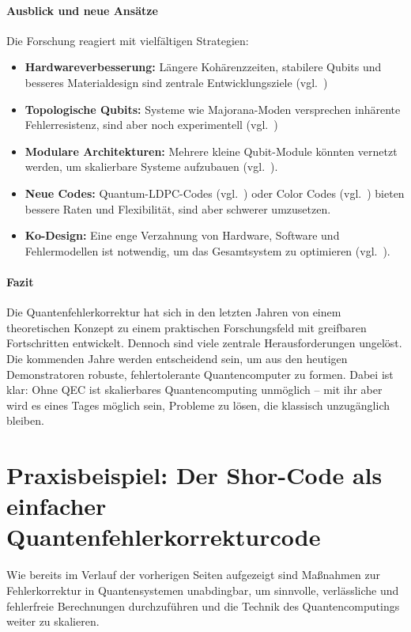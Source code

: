 \paragraph{Ausblick und neue Ans\"atze}
Die Forschung reagiert mit vielf\"altigen Strategien:
\begin{itemize}
    \item \textbf{Hardwareverbesserung:} Längere Kohärenzzeiten, stabilere Qubits und besseres Materialdesign sind zentrale Entwicklungsziele (vgl.~\cite[309]{terhal_quantum_2015})
    \item \textbf{Topologische Qubits:} Systeme wie Majorana-Moden versprechen inhärente Fehlerresistenz, sind aber noch experimentell (vgl.~\cite[320]{terhal_quantum_2015})
    \item \textbf{Modulare Architekturen:} Mehrere kleine Qubit-Module könnten vernetzt werden, um skalierbare Systeme aufzubauen (vgl.~\cite[332-333]{terhal_quantum_2015}).
    \item \textbf{Neue Codes:} Quantum-LDPC-Codes (vgl.~\cite[342]{terhal_quantum_2015}) oder Color Codes (vgl.~\cite[327]{terhal_quantum_2015}) bieten bessere Raten und Flexibilität, sind aber schwerer umzusetzen.
    \item \textbf{Ko-Design:} Eine enge Verzahnung von Hardware, Software und Fehlermodellen ist notwendig, um das Gesamtsystem zu optimieren (vgl.~\cite[308]{terhal_quantum_2015}).
\end{itemize}

\paragraph{Fazit} 
Die Quantenfehlerkorrektur hat sich in den letzten Jahren von einem theoretischen Konzept zu einem praktischen Forschungsfeld mit greifbaren Fortschritten entwickelt. Dennoch sind viele zentrale Herausforderungen ungel\"ost. Die kommenden Jahre werden entscheidend sein, um aus den heutigen Demonstratoren robuste, fehlertolerante Quantencomputer zu formen. Dabei ist klar: Ohne QEC ist skalierbares Quantencomputing unm\"oglich -- mit ihr aber wird es eines Tages m\"oglich sein, Probleme zu l\"osen, die klassisch unzug\"anglich bleiben.

\section{Praxisbeispiel: Der Shor-Code als einfacher Quantenfehlerkorrekturcode}
Wie bereits im Verlauf der vorherigen Seiten aufgezeigt sind Maßnahmen zur Fehlerkorrektur in Quantensystemen unabdingbar, um sinnvolle, verlässliche und fehlerfreie Berechnungen durchzuführen und die Technik des Quantencomputings weiter zu skalieren.

